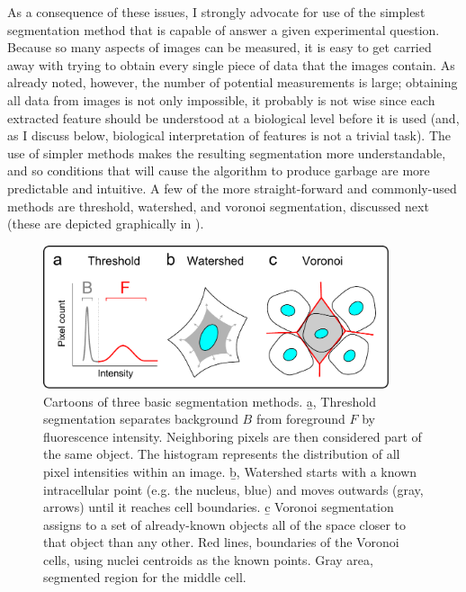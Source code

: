 As a consequence of these issues, I strongly advocate for use of the simplest
segmentation method that is capable of answer a given
experimental question. Because so many aspects of images
can be measured, it is easy to get carried away with trying to
obtain every single piece of data that the images contain. As already noted, however,
the number of potential measurements is large;
obtaining all data from images is not only impossible, it probably
is not wise since each extracted feature should be understood at a
biological level before it is used (and, as I discuss below, biological
interpretation of features is not a trivial task).
The use of simpler methods makes the resulting segmentation more 
understandable, and so conditions that will cause the algorithm
to produce garbage are more predictable and intuitive. A few of
the more straight-forward and commonly-used methods are
threshold, watershed, and voronoi segmentation, discussed next
(these are depicted graphically in ).


  \begin{figure}[!bt]
  \centering
  \includegraphics[width=4in]{FIGS/imaging/segmentationMethods.pdf}
  {\singlespacing 
  \caption[ Cartoon of segmentation methods.]
            {Cartoons of three basic segmentation
            methods. \b{a}, Threshold segmentation separates
            background $B$ from foreground $F$ by fluorescence
            intensity. Neighboring pixels are then considered
            part of the same object. The histogram
            represents the distribution of
            all pixel intensities within an image.
            \b{b}, Watershed starts with a known
            intracellular point (e.g. the nucleus, blue)
            and moves outwards (gray, arrows) until it reaches
            cell boundaries. \b{c} Voronoi segmentation assigns
            to a set of already-known objects all of the space closer to
            that object than any other. Red lines, boundaries
            of the Voronoi cells,
            using nuclei centroids as the known points. Gray area,
            segmented region for the middle cell.}
  \label{fig:imaging:segmentationMethods}}
  \end{figure}
  
